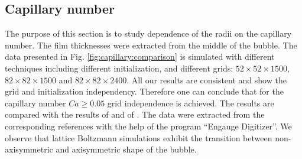 \documentclass[preprint,12pt]{elsarticle}
\begin{document}
\subsection{Capillary number}
The purpose of this section is to study dependence of the radii on the capillary number. The film
thicknesses were extracted from the middle of the bubble. The data presented in Fig.
\ref{fig:capillary:comparison} is simulated with different techniques including different
initialization, and different grids: $52 \times 52 \times 1500$, $82 \times 82 \times 1500$ and $82
\times 82 \times 2400$. All our results are consistent {\color{red} and show the grid and
initialization independency}. Therefore one can conclude that for the
capillary number $Ca\geq
0.05$ grid independence is achieved. The results are compared with the results of
\citet{heil-threedim} and of \citet{wang-non-circular}. The data were extracted from the
corresponding references with the help of the program ``Engauge Digitizer''. We observe that
lattice Boltzmann simulations exhibit 
the transition between non-axisymmetric and axisymmetric shape of the bubble. 
\end{document}
